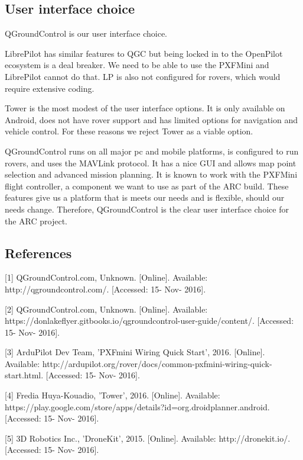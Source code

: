 \documentclass[compsoc,draftclsnofoot,onecolumn,10pt]{IEEEtran}
\begin{document}
\subsection{User interface choice}
QGroundControl is our user interface choice.\par
LibrePilot has similar features to QGC but being locked in to the OpenPilot
ecosystem is a deal breaker. We need to be able to use the PXFMini and
LibrePilot cannot do that. LP is also not configured for rovers, which would
require extensive coding.\par
Tower is the most modest of the user interface options. It is only available on
Android, does not have rover support and has limited options for navigation and
vehicle control. For these reasons we reject Tower as a viable option.\par
QGroundControl runs on all major pc and mobile platforms, is configured to run
rovers, and uses the MAVLink protocol. It has a nice GUI and allows map point
selection and advanced mission planning. It is known to work with the PXFMini
flight controller, a component we want to use as part of the ARC build. These
features give us a platform that is meets our needs and is flexible, should our
needs change. Therefore, QGroundControl is the clear user interface choice for
the ARC project.

\subsection{References}

[1] QGroundControl.com, Unknown. [Online]. Available: http://qgroundcontrol.com/. [Accessed: 15- Nov- 2016].\par

[2] QGroundControl.com, Unknown. [Online]. Available: https://donlakeflyer.gitbooks.io/qgroundcontrol-user-guide/content/. [Accessed: 15- Nov- 2016].\par

[3] ArduPilot Dev Team, 'PXFmini Wiring Quick Start', 2016. [Online]. Available: http://ardupilot.org/rover/docs/common-pxfmini-wiring-quick-start.html.  [Accessed: 15- Nov- 2016].\par

[4] Fredia Huya-Kouadio, 'Tower', 2016. [Online]. Available: https://play.google.com/store/apps/details?id=org.droidplanner.android.  [Accessed: 15- Nov- 2016].\par

[5] 3D Robotics Inc., 'DroneKit', 2015. [Online]. Available: http://dronekit.io/. [Accessed: 15- Nov- 2016].\par
\end{document}
